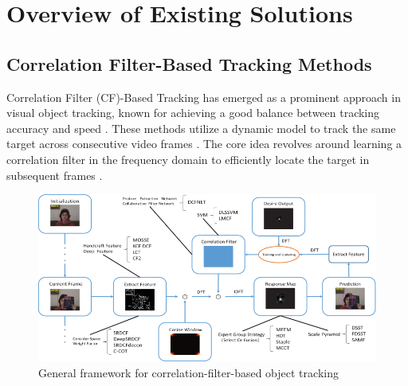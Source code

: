 \chapter{Overview of Existing Solutions}
\label{ch:chap2}

\section{Correlation Filter-Based Tracking Methods}
\label{sec:tradi}

Correlation Filter (CF)-Based Tracking has emerged as a prominent approach in visual object tracking, known for achieving a good balance between tracking accuracy and speed \cite{feng2019dynamic}. These methods utilize a dynamic model to track the same target across consecutive video frames \cite{du2021overview}. The core idea revolves around learning a correlation filter in the frequency domain to efficiently locate the target in subsequent frames \cite{zhao2020correlation}.

\begin{figure}[ht]
    \centering
    \includegraphics[width=1\linewidth]{images/General framework for correlation-filter-based object tracking.png}
    \caption{General framework for correlation-filter-based object tracking \cite{du2021overview}}
    \label{fig:CF-general-framework}
\end{figure}

